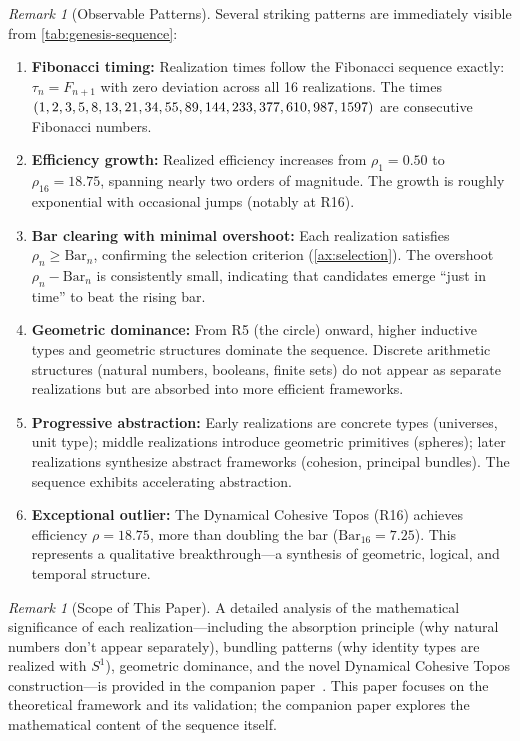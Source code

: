 \documentclass[11pt]{article}
\theoremstyle{definition}
\theoremstyle{remark}
\newtheorem{remark}[theorem]{Remark}
\begin{document}
\begin{remark}[Observable Patterns]
\label{rem:genesis-patterns}
Several striking patterns are immediately visible from \cref{tab:genesis-sequence}:

\begin{enumerate}
\item \textbf{Fibonacci timing:} Realization times follow the Fibonacci sequence exactly: $\tau_n = F_{n+1}$ with zero deviation across all 16 realizations. The times $(1, 2, 3, 5, 8, 13, 21, 34, 55, 89, 144, 233, 377,\\ 610, 987, 1597)$ are consecutive Fibonacci numbers.

\item \textbf{Efficiency growth:} Realized efficiency increases from $\rho_1 = 0.50$ to $\rho_{16} = 18.75$, spanning nearly two orders of magnitude. The growth is roughly exponential with occasional jumps (notably at R16).

\item \textbf{Bar clearing with minimal overshoot:} Each realization satisfies $\rho_n \geq \mathrm{Bar}_n$, confirming the selection criterion (\cref{ax:selection}). The overshoot $\rho_n - \mathrm{Bar}_n$ is consistently small, indicating that candidates emerge ``just in time'' to beat the rising bar.

\item \textbf{Geometric dominance:} From R5 (the circle) onward, higher inductive types and geometric structures dominate the sequence. Discrete arithmetic structures (natural numbers, booleans, finite sets) do not appear as separate realizations but are absorbed into more efficient frameworks.

\item \textbf{Progressive abstraction:} Early realizations are concrete types (universes, unit type); middle realizations introduce geometric primitives (spheres); later realizations synthesize abstract frameworks (cohesion, principal bundles). The sequence exhibits accelerating abstraction.

\item \textbf{Exceptional outlier:} The Dynamical Cohesive Topos (R16) achieves efficiency $\rho = 18.75$, more than doubling the bar ($\mathrm{Bar}_{16} = 7.25$). This represents a qualitative breakthrough---a synthesis of geometric, logical, and temporal structure.
\end{enumerate}
\end{remark}

\begin{remark}[Scope of This Paper]
A detailed analysis of the mathematical significance of each realization---including the absorption principle (why natural numbers don't appear separately), bundling patterns (why identity types are realized with $S^1$), geometric dominance, and the novel Dynamical Cohesive Topos construction---is provided in the companion paper~\cite{lande2025genesis}. This paper focuses on the theoretical framework and its validation; the companion paper explores the mathematical content of the sequence itself.
\end{remark}
\end{document}
